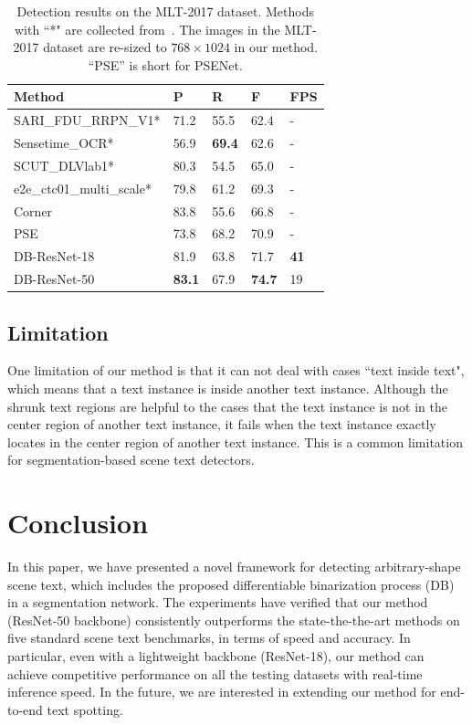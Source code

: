 \documentclass[letterpaper]{article} %
\begin{document}
\begin{table}[!ht]
\centering
\caption{Detection results on the MLT-2017 dataset. Methods with ``*" are collected from~\cite{lyu2018multi}. The images in the MLT-2017 dataset are re-sized to $768 \times 1024$ in our method. ``PSE'' is short for PSENet.}
\begin{tabularx}{1.0\linewidth}{@{}l*{4}X@{}}
\toprule
Method        & P             & R             & F             & FPS         \\ \midrule
SARI\_FDU\_RRPN\_V1*       & 71.2            & 55.5            & 62.4            & -         \\
Sensetime\_OCR*       & 56.9            & \textbf{69.4}            & 62.6            & -         \\
SCUT\_DLVlab1*     & 80.3            & 54.5         & 65.0          & -           \\
e2e\_ctc01\_multi\_scale*    & 79.8          & 61.2          & 69.3          & -         \\
Corner~\cite{lyu2018multi}          & 83.8          & 55.6          & 66.8          & -        \\
PSE~\cite{wang2019shape}          & 73.8            & 68.2            & 70.9            & -         \\
\midrule
DB-ResNet-18 & 81.9          & 63.8          & 71.7          & \textbf{41} \\
DB-ResNet-50 & \textbf{83.1} & 67.9 & \textbf{74.7} & 19          \\ \bottomrule
\end{tabularx}
\label{tab:mlt}
\end{table}



\subsection{Limitation}
One limitation of our method is that it can not deal with cases ``text inside text", which means that a text instance is inside another text instance.
Although the shrunk text regions are helpful to the cases that the text instance is not in the center region of another text instance, it fails when the text instance exactly locates in the center region of another text instance. This is a common limitation for segmentation-based scene text detectors.



\section{Conclusion}
In this paper, we have presented a novel framework for detecting arbitrary-shape scene text, which includes the proposed differentiable binarization process (DB) in a segmentation network. The experiments have verified that our method (ResNet-50 backbone) consistently outperforms the state-the-the-art methods on five standard scene text benchmarks, in terms of speed and accuracy. In particular, even with a lightweight backbone (ResNet-18), our method can achieve competitive performance on all the testing datasets with real-time inference speed. In the future, we are interested in extending our method for end-to-end text spotting.
\end{document}
